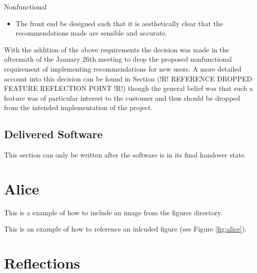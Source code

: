 \documentclass{l3proj}
\begin{document}
Nonfunctional
\begin{itemize}
\item The front end be designed such that it is aesthetically clear that the recommendations made are sensible and accurate.
\end{itemize}

With the addition of the above requirements the decision was made in the aftermath of the January 26th meeting to drop the proposed nonfunctional requirement of implementing recommendations for new users. A more detailed account into this decision can be found in Section (!R! REFERENCE DROPPED FEATURE REFLECTION POINT !R!) though the general belief was that such a feature was of particular interest to the customer and thus should be dropped from the intended implementation of the project.


\subsection{Delivered Software}
\label{sec:finsoftware}
This section can only be written after the software is in its final handover state.
\newpage


\section{Alice}
\label{sec:alice}

This is a example of how to include an image from the figures directory.



This is an example of how to reference an inlcuded figure (see Figure \ref{fig:alice}).

\section{Reflections}
\label{sec:reflections}
\end{document}
